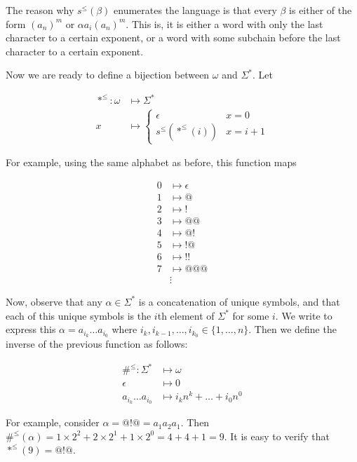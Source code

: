 \documentclass[a4paper, 12pt]{article}
\begin{document}
The reason why $s^{\leq}( \beta  )$ enumerates the language is that every $\beta
$ is either of the form $(a_n)^{m}$ or $\alpha a_i (a_n)^{m}$. This is, it is
either a word with only the last character to a certain exponent, or a word with
some subchain before the last character to a certain exponent.

Now we are ready to define a bijection between $\omega$ and $\Sigma^{*}$. Let 

\begin{align*}
    *^{\leq} : \omega &\mapsto \Sigma^{*} \\ 
    x &\mapsto \begin{cases}
        \epsilon & x = 0 \\ 
        s^{\leq} \left( *^{\leq} \left( i \right)  \right) & x = i + 1
    \end{cases}
\end{align*}

For example, using the same alphabet as before, this function maps 

\begin{align*}
    0 &\mapsto \epsilon \\ 
    1 &\mapsto @ \\ 
    2 &\mapsto ! \\ 
    3 &\mapsto @@ \\ 
    4 &\mapsto @! \\ 
    5 &\mapsto !@ \\ 
    6 &\mapsto  !! \\ 
    7 &\mapsto  @@@ \\ 
      &\vdots
\end{align*}

Now, observe that any $\alpha \in \Sigma^{*}$ is a concatenation of unique
symbols, and that each of this unique symbols is the $i$th element of
$\Sigma^{*}$ for some $i$. We write to express this $\alpha = a_{i_k}\ldots
a_{i_0}$ where $i_{k}, i_{k-1}, \ldots, i_{k_0} \in \{ 1, \ldots, n\}$. Then we
define the inverse of the previous function as follows: 

\begin{align*}
    \#^{\leq} : \Sigma^{*} &\mapsto \omega \\ 
    \epsilon & \mapsto 0 \\ 
    a_{i_k} \ldots a_{i_0} &\mapsto i_k n^{k} + \ldots + i_0 n^0
\end{align*}

For example, consider $\alpha = @!@ = a_{1} a_2 a_1$. Then $\#^{\leq}( \alpha )
= 1 \times 2^2 + 2 \times 2^1 + 1 \times 2^0 = 4 + 4 + 1 = 9$. It is easy to
verify that $*^{\leq}( 9 ) = @!@$.
\end{document}
